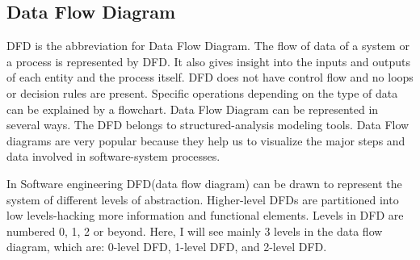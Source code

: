 \documentclass[12pt]{article}
\begin{document}
\subsection{Data Flow Diagram}

DFD is the abbreviation for Data Flow Diagram. The flow of data of a system or a process is represented by DFD. It also gives insight into the inputs and outputs of each entity and the process itself. DFD does not have control flow and no loops or decision rules are present. Specific operations depending on the type of data can be explained by a flowchart. Data Flow Diagram can be represented in several ways. The DFD belongs to structured-analysis modeling tools. Data Flow diagrams are very popular because they help us to visualize the major steps and data involved in software-system processes.

In Software engineering DFD(data flow diagram) can be drawn to represent the system of different levels of abstraction. Higher-level DFDs are partitioned into low levels-hacking more information and functional elements. Levels in DFD are numbered 0, 1, 2 or beyond. Here, I will see mainly 3 levels in the data flow diagram, which are: 0-level DFD, 1-level DFD, and 2-level DFD. 	
\end{document}
